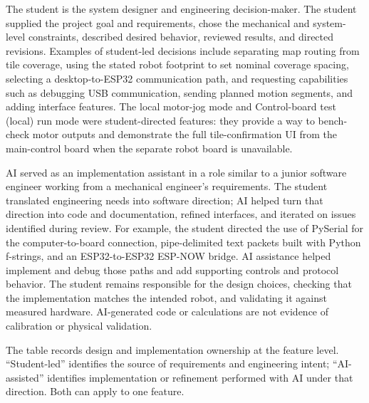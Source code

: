 \documentclass{article}
\begin{document}
The student is the system designer and engineering decision-maker. The student supplied the project goal and requirements, chose the mechanical and system-level constraints, described desired behavior, reviewed results, and directed revisions. Examples of student-led decisions include separating map routing from tile coverage, using the stated robot footprint to set nominal coverage spacing, selecting a desktop-to-ESP32 communication path, and requesting capabilities such as debugging USB communication, sending planned motion segments, and adding interface features. The local motor-jog mode and Control-board test (local) run mode were student-directed features: they provide a way to bench-check motor outputs and demonstrate the full tile-confirmation UI from the main-control board when the separate robot board is unavailable.

AI served as an implementation assistant in a role similar to a junior software engineer working from a mechanical engineer's requirements. The student translated engineering needs into software direction; AI helped turn that direction into code and documentation, refined interfaces, and iterated on issues identified during review. For example, the student directed the use of PySerial for the computer-to-board connection, pipe-delimited text packets built with Python f-strings, and an ESP32-to-ESP32 ESP-NOW bridge. AI assistance helped implement and debug those paths and add supporting controls and protocol behavior. The student remains responsible for the design choices, checking that the implementation matches the intended robot, and validating it against measured hardware. AI-generated code or calculations are not evidence of calibration or physical validation.

The table records design and implementation ownership at the feature level. ``Student-led'' identifies the source of requirements and engineering intent; ``AI-assisted'' identifies implementation or refinement performed with AI under that direction. Both can apply to one feature.
\end{document}
